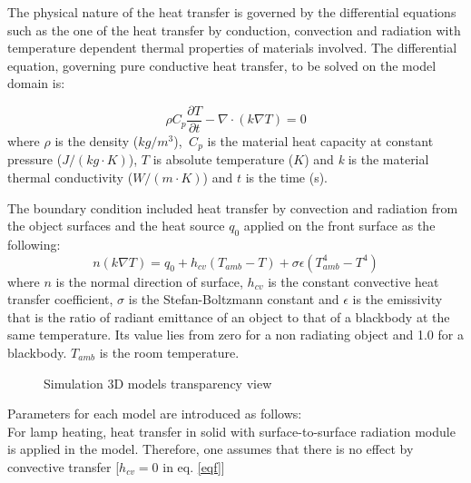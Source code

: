 The physical nature of the heat transfer is governed by the differential equations such as the one of the heat transfer by conduction, convection and radiation with temperature dependent thermal properties of materials involved. The differential equation, governing pure conductive heat transfer, to be solved on the model domain is: 

\begin{equation}
\rho C_p \frac{\partial T}{\partial t}-\nabla \cdot (k\nabla T) = 0
\end{equation}
where $\rho$ is the density (\textit{$kg/m^3$}),   $C_p$ is the material heat capacity at constant pressure ($J/(kg·K)$), $ T $ is absolute temperature ($K$) and \textit{k} is the material thermal conductivity ($W/(m·K)$) and $ t $ is the time (s).

The boundary condition included heat transfer by convection and radiation from the object surfaces and the  heat  source $q_0$  applied on the front surface as the following: 
\begin{equation}
n(k\nabla T) = q_0 + h_{cv}(T_{amb}-T)+\sigma \epsilon(T_{amb}^4-T^4)
\label{eqf}
\end{equation}
where $n$ is the normal direction of surface, $ h_{cv} $ is the constant convective heat transfer coefficient, $\sigma$ is the Stefan-Boltzmann constant  and $\epsilon$ is the emissivity that is the ratio of radiant emittance of an object to that of a blackbody at the same temperature. Its value lies from zero for a non radiating object and 1.0 for a blackbody. $ T_{amb} $ is the room temperature.

\begin{figure}[ht]
    \hspace{-8pt}
    \hspace{-5pt}
    \caption{Simulation 3D models transparency view}
    \label{models}
\end{figure}
Parameters for each model are introduced as follows:\\
For lamp heating, heat transfer in solid with surface-to-surface radiation module is applied in the model. Therefore, one assumes that there is no effect by convective transfer [$h_{cv}=0$ in eq. \ref{eqf}]

